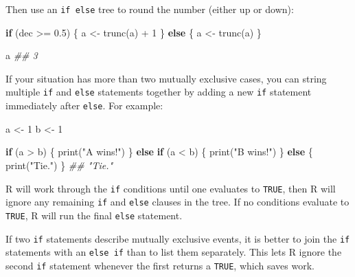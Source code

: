 \documentclass[
  letterpaper,
  DIV=11,
  numbers=noendperiod]{scrbook}
\newenvironment{Shaded}{\begin{snugshade}}{\end{snugshade}}
\newcommand{\ControlFlowTok}[1]{\textcolor[rgb]{0.00,0.23,0.31}{\textbf{#1}}}
\newcommand{\DecValTok}[1]{\textcolor[rgb]{0.68,0.00,0.00}{#1}}
\newcommand{\DocumentationTok}[1]{\textcolor[rgb]{0.37,0.37,0.37}{\textit{#1}}}
\newcommand{\FloatTok}[1]{\textcolor[rgb]{0.68,0.00,0.00}{#1}}
\newcommand{\FunctionTok}[1]{\textcolor[rgb]{0.28,0.35,0.67}{#1}}
\newcommand{\NormalTok}[1]{\textcolor[rgb]{0.00,0.23,0.31}{#1}}
\newcommand{\OtherTok}[1]{\textcolor[rgb]{0.00,0.23,0.31}{#1}}
\newcommand{\SpecialCharTok}[1]{\textcolor[rgb]{0.37,0.37,0.37}{#1}}
\newcommand{\StringTok}[1]{\textcolor[rgb]{0.13,0.47,0.30}{#1}}
\begin{document}
Then use an \texttt{if\ else} tree to round the number (either up or
down):

\begin{Shaded}
\begin{Highlighting}[]
\ControlFlowTok{if}\NormalTok{ (dec }\SpecialCharTok{\textgreater{}=} \FloatTok{0.5}\NormalTok{) \{}
\NormalTok{  a }\OtherTok{\textless{}{-}} \FunctionTok{trunc}\NormalTok{(a) }\SpecialCharTok{+} \DecValTok{1}
\NormalTok{\} }\ControlFlowTok{else}\NormalTok{ \{}
\NormalTok{  a }\OtherTok{\textless{}{-}} \FunctionTok{trunc}\NormalTok{(a)}
\NormalTok{\}}

\NormalTok{a}
\DocumentationTok{\#\# 3}
\end{Highlighting}
\end{Shaded}

If your situation has more than two mutually exclusive cases, you can
string multiple \texttt{if} and \texttt{else} statements together by
adding a new \texttt{if} statement immediately after \texttt{else}. For
example:

\begin{Shaded}
\begin{Highlighting}[]
\NormalTok{a }\OtherTok{\textless{}{-}} \DecValTok{1}
\NormalTok{b }\OtherTok{\textless{}{-}} \DecValTok{1}

\ControlFlowTok{if}\NormalTok{ (a }\SpecialCharTok{\textgreater{}}\NormalTok{ b) \{}
  \FunctionTok{print}\NormalTok{(}\StringTok{"A wins!"}\NormalTok{)}
\NormalTok{\} }\ControlFlowTok{else} \ControlFlowTok{if}\NormalTok{ (a }\SpecialCharTok{\textless{}}\NormalTok{ b) \{}
  \FunctionTok{print}\NormalTok{(}\StringTok{"B wins!"}\NormalTok{)}
\NormalTok{\} }\ControlFlowTok{else}\NormalTok{ \{}
  \FunctionTok{print}\NormalTok{(}\StringTok{"Tie."}\NormalTok{)}
\NormalTok{\}}
\DocumentationTok{\#\# "Tie."}
\end{Highlighting}
\end{Shaded}

R will work through the \texttt{if} conditions until one evaluates to
\texttt{TRUE}, then R will ignore any remaining \texttt{if} and
\texttt{else} clauses in the tree. If no conditions evaluate to
\texttt{TRUE}, R will run the final \texttt{else} statement.

If two \texttt{if} statements describe mutually exclusive events, it is
better to join the \texttt{if} statements with an \texttt{else\ if} than
to list them separately. This lets R ignore the second \texttt{if}
statement whenever the first returns a \texttt{TRUE}, which saves work.
\end{document}
